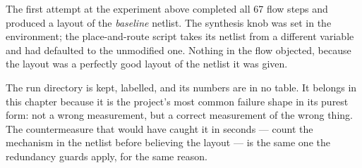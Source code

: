 The first attempt at the experiment above completed all 67 flow steps
and produced a layout of the \emph{baseline} netlist. The synthesis
knob was set in the environment; the place-and-route script takes its
netlist from a different variable and had defaulted to the unmodified
one. Nothing in the flow objected, because the layout was a perfectly
good layout of the netlist it was given.

The run directory is kept, labelled, and its numbers are in no table.
It belongs in this chapter because it is the project's most common
failure shape in its purest form: not a wrong measurement, but a
correct measurement of the wrong thing. The countermeasure that would
have caught it in seconds --- count the mechanism in the netlist before
believing the layout --- is the same one the redundancy guards apply,
for the same reason.
